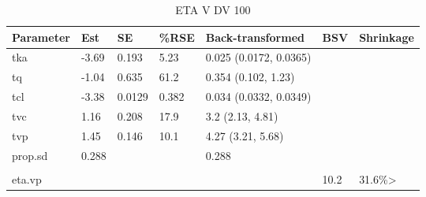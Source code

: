 \begin{table}
\centering\centering
\caption{ETA V DV 100}
\centering
\fontsize{8}{10}\selectfont
\begin{tabular}[t]{lllllll}
\toprule
\textbf{Parameter} & \textbf{Est} & \textbf{SE} & \textbf{\%RSE} & \textbf{Back-transformed} & \textbf{BSV} & \textbf{Shrinkage}\\
\midrule
tka & -3.69 & 0.193 & 5.23 & 0.025 (0.0172, 0.0365) &  & \\
\midrule
tq & -1.04 & 0.635 & 61.2 & 0.354 (0.102, 1.23) &  & \\
\midrule
tcl & -3.38 & 0.0129 & 0.382 & 0.034 (0.0332, 0.0349) &  & \\
\midrule
tvc & 1.16 & 0.208 & 17.9 & 3.2 (2.13, 4.81) &  & \\
\midrule
tvp & 1.45 & 0.146 & 10.1 & 4.27 (3.21, 5.68) &  & \\
\midrule
prop.sd & 0.288 &  &  & 0.288 &  & \\
\midrule\\
eta.vp &  &  &  &  & 10.2 & 31.6\%>\\
\bottomrule
\end{tabular}
\end{table}